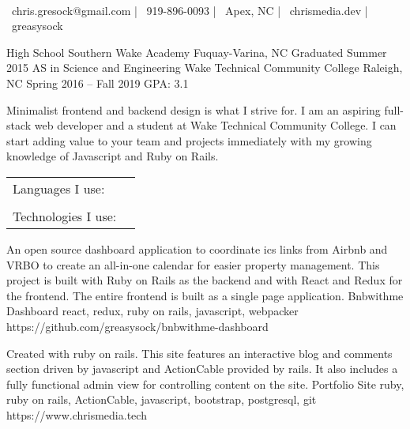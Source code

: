\documentclass[]{awesome-cv}
\begin{document}
    
\begin{center}
	  \\
	\vspace{2mm}
	{\faEnvelope\ chris.gresock@gmail.com} | {\faMobile\ 919-896-0093} | {\faMapMarker\ Apex, NC} | {\faLink\ chrismedia.dev} | {\faGithub\ greasysock}
\end{center}
\begin{cventries}
	\cventry
	{High School}
	{Southern Wake Academy}
	{Fuquay-Varina, NC}
	{Graduated Summer 2015}
	{}
	\cventry
	{AS in Science and Engineering}
	{Wake Technical Community College}
	{Raleigh, NC}
	{Spring 2016 – Fall 2019}
	{GPA: 3.1}
\end{cventries}

\vspace{-2mm}

	Minimalist frontend and backend design is what I strive for. I am an aspiring full-stack web developer and a student at Wake Technical Community College. I can start adding value to your team and projects immediately with my growing knowledge of Javascript and Ruby on Rails.

\begin{cventries}
	\cventry
	{}
	{\def\arraystretch{1.15}{\begin{tabular}{ l l }
		Languages I use:  & {\skill{ Python (95\%), Ruby (85\%), Go (35\%), Javascript (75\%)}} \\
		\\
		Technologies I use:  & {\skill{ Ruby on Rails (Ruby), React (Javascript),  Redux (Javscript), Sqlalchemy (Python), Git}} \\
		\end{tabular}}}
	{}
	{}
	{}
\end{cventries}

\vspace{-7mm}
\begin{cventries}
	\cventry
	{An open source dashboard application to coordinate ics links from Airbnb and VRBO to create an all-in-one calendar for easier property management. This project is built with Ruby on Rails as the backend and with React and Redux for the frontend. The entire frontend is built as a single page application.}
	{Bnbwithme Dashboard}
	{react, redux, ruby on rails, javascript, webpacker}
	{https://github.com/greasysock/bnbwithme-dashboard}
	{}
	
	\vspace{-5mm}
	\cventry
	{Created with ruby on rails. This site features an interactive blog and comments section driven by javascript and ActionCable provided by rails. It also includes a fully functional admin view for controlling content on the site.}
	{Portfolio Site}
	{ruby, ruby on rails, ActionCable, javascript, bootstrap, postgresql, git}
	{https://www.chrismedia.tech}
	{}
	
	\vspace{-5mm}
\end{cventries}
\end{document}
